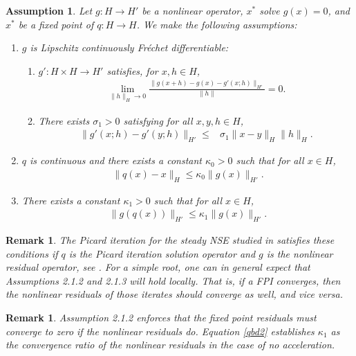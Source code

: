 \documentclass{article}
\numberwithin{equation}{section}
\newtheorem{remark}[thm]{Remark}
\newtheorem{assumption}[thm]{Assumption}
\begin{document}
\begin{assumption}
\label{assum1}
    Let $g:  H  \to H'$ be a nonlinear operator, $x^*$ solve $g(x) =0$, and $x^*$ be a fixed point of $q:H\rightarrow H$.
        We make the following assumptions: 
    \begin{enumerate}
        \item $g$ is Lipschitz continuously Fr\'echet differentiable:
        \begin{enumerate}
        \item $g':H\times H \to H'$ satisfies, for $x,h\in H$, 
        \begin{align*}
      \lim\limits_{\|h\|_H \to 0}  \frac{\| g(x+h) - g(x) - g'(x;h)\|_{H'}}{\|h\|} =0.
    \end{align*} 
	\item There exists $\sigma_1>0$ satisfying for all $x,y,h\in H$,
    \begin{align}
      \| g'(x;h)- g'(y;h)\|_{H'} \le& \sigma_1 \|x-y\|_{H}\|h\|_{H}.
      \label{gineq1}
    \end{align}
 \end{enumerate}
 
     \item  $q$ is continuous and there exists a constant $\kappa_0>0$ such that for all $x\in H$,
    \begin{align}
    \label{qbd1}
         \|  q(x) - x \|_{H} \le \kappa_0 \| g(x)\|_{H'}.
    \end{align}
    \item  There exists a constant $\kappa_1>0$ such that for all $x\in H$,
    \begin{align}
    \label{qbd2}
         \|  g(q(x)) \|_{H'} \le \kappa_1 \| g(x)\|_{H'}.
    \end{align}
    \end{enumerate}  
\end{assumption}


\begin{remark}
The Picard iteration for the steady NSE studied in \cite{PRX19,HR26} satisfies these conditions if $q$ is the Picard iteration solution operator and $g$ is the nonlinear residual operator, see \cite{HR26}.  For a simple root, one can in general expect that Assumptions 2.1.2 and 2.1.3 will hold locally.  That is, if a FPI converges, then the nonlinear residuals of those iterates should converge as well, and vice versa.
\end{remark}


\begin{remark}
Assumption 2.1.2 enforces that the fixed point residuals must converge to zero if the nonlinear residuals do.  Equation \eqref{qbd2} establishes $\kappa_1$ as the convergence ratio of the nonlinear residuals in the case of no acceleration.  
\end{remark}
\end{document}
